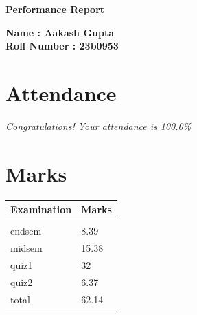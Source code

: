 \documentclass[a4paper, 11pt]{article}
\begin{document}
\begin{center}
    {\fontsize{30}{32}\selectfont \textbf{Performance Report}}
\end{center}
\vspace{2cm}
{\fontsize{16}{18}\selectfont \textbf{Name : \color{darkblue}Aakash Gupta}}\\ %
\newline
{\fontsize{16}{18}\selectfont \textbf{Roll Number : \color{darkblue}23b0953}} %
\vspace{1cm}
\section{\fontsize{20}{22}\textbf{Attendance}}
{\fontsize{14}{16}\textit{\underline{\color{darkblue}Congratulations! Your attendance is 100.0\%}}}\\ 
\vspace{1cm}
\section{\fontsize{20}{22}\textbf{Marks}}
\vspace{2cm}
\begin{table}[!h]
    \centering
    \fontsize{18}{20}\selectfont
    \begin{tabular}{|p{5cm}|p{5cm}|}
    \hline
    \textbf{Examination} & \textbf{Marks} \\
    \hline
    \hline\\endsem & 8.39 \\
midsem & 15.38 \\
quiz1 & 32 \\
quiz2 & 6.37 \\
total & 62.14 \\
\hline
    \end{tabular}
\end{table}
\newpage
\vspace{3cm}
\end{document}
